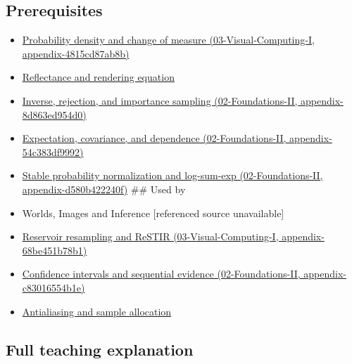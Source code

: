 \subsection{Prerequisites}\label{appendix-031e02bf28af-prerequisites}

\begin{itemize}
\item
  \href{../03-Visual-Computing-I/main.pdf\#nameddest=appendix-4815cd87ab8b}{Probability density and change of measure (03-Visual-Computing-I, appendix-4815cd87ab8b)}
\item
  \hyperref[appendix-96da0b153b77]{Reflectance and rendering equation}
\item
  \href{../02-Foundations-II/main.pdf\#nameddest=appendix-8d863ed954d0}{Inverse, rejection, and importance sampling (02-Foundations-II, appendix-8d863ed954d0)}
\item
  \href{../02-Foundations-II/main.pdf\#nameddest=appendix-54c383df9992}{Expectation, covariance, and dependence (02-Foundations-II, appendix-54c383df9992)}
\item
  \href{../02-Foundations-II/main.pdf\#nameddest=appendix-d580b422240f}{Stable probability normalization and log-sum-exp (02-Foundations-II, appendix-d580b422240f)} \#\# Used by
\item
  {Worlds, Images and Inference {[}referenced source unavailable{]}}
\item
  \href{../03-Visual-Computing-I/main.pdf\#nameddest=appendix-68be451b78b1}{Reservoir resampling and ReSTIR (03-Visual-Computing-I, appendix-68be451b78b1)}
\item
  \href{../02-Foundations-II/main.pdf\#nameddest=appendix-c83016554b1e}{Confidence intervals and sequential evidence (02-Foundations-II, appendix-c83016554b1e)}
\item
  \hyperref[appendix-4192b2bdd21e]{Antialiasing and sample allocation}
\end{itemize}

\subsection{Full teaching explanation}\label{appendix-031e02bf28af-full-teaching-explanation}

